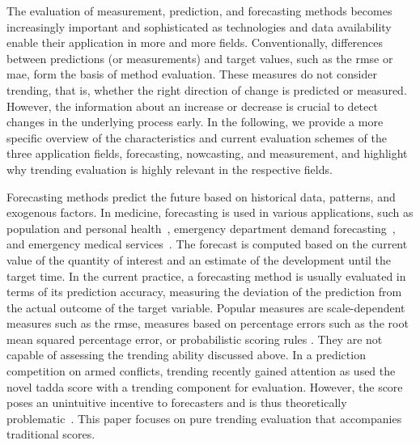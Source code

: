 The evaluation of measurement, prediction, and forecasting methods becomes increasingly important and sophisticated as technologies and data availability enable their application in more and more fields. 
Conventionally, differences between predictions (or measurements) and target values, such as the \ac{rmse} or \ac{mae}, form the basis of method evaluation. 
These measures do not consider trending, that is, whether the right direction of change is predicted or measured.
However, the information about an increase or decrease is crucial to detect changes in the underlying process early. 
In the following, we provide a more specific overview of the characteristics and current evaluation schemes of the three application fields, forecasting, nowcasting, and measurement, and highlight why trending evaluation is highly relevant in the respective fields.

Forecasting methods predict the future based on historical data, patterns, and exogenous factors. 
In medicine, forecasting is used in various applications, such as population and personal health~\parencite[see, e.g., the review in]{Soyiri2013}, emergency department demand forecasting~\parencite{Jones2008,Rostami-Tabar2023}, and emergency medical services~\parencite{HaugsboHermansen2021}.
The forecast is computed based on the current value of the quantity of interest and an estimate of the development until the target time.
In the current practice, a forecasting method is usually evaluated in terms of its prediction accuracy, measuring the deviation of the prediction from the actual outcome of the target variable. 
Popular measures are scale-dependent measures such as the \ac{rmse}, measures based on percentage errors such as the root mean squared percentage error, or probabilistic scoring rules \citep[see the review in][]{hyndman2006another}. 
They are not capable of assessing the trending ability discussed above.
In a prediction competition on armed conflicts, trending recently gained attention as \citet{Vesco2022} used the novel \ac{tadda} score with a trending component for evaluation. 
However, the score poses an unintuitive incentive to forecasters and is thus theoretically problematic~\parencite{Bracher2023}.
This paper focuses on pure trending evaluation that accompanies traditional scores.

